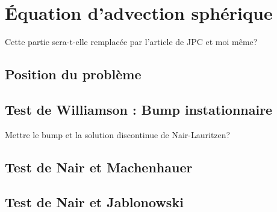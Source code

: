 
\chapter{\'Equation d'advection sphérique}

Cette partie sera-t-elle remplacée par l'article de JPC et moi même?

\section{Position du problème}

\section{Test de Williamson : Bump instationnaire}

Mettre le bump et la solution discontinue de Nair-Lauritzen?

\section{Test de Nair et Machenhauer}

\section{Test de Nair et Jablonowski}